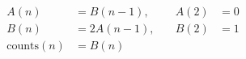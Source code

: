 \documentclass{article}
\begin{document}
\begin{align*}
A(n) &= B(n-1), \quad &A(2) &= 0 \\
B(n) &= 2A(n-1), \quad &B(2) &= 1 \\
\text{counts}(n) &= B(n)
\end{align*}
\end{document}

